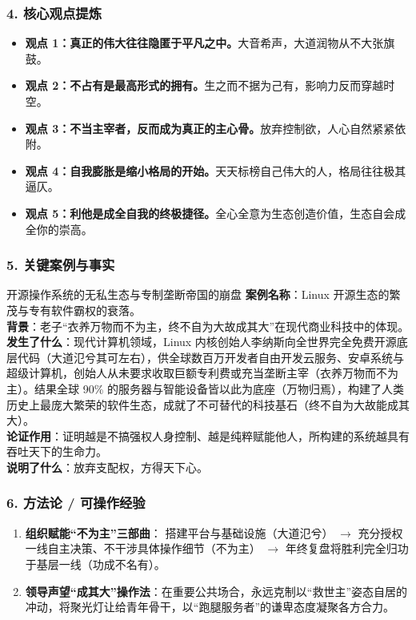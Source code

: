 \subsubsection{4. 核心观点提炼}
\begin{itemize}
    \item \textbf{观点 1：真正的伟大往往隐匿于平凡之中。}大音希声，大道润物从不大张旗鼓。
    \item \textbf{观点 2：不占有是最高形式的拥有。}生之而不据为己有，影响力反而穿越时空。
    \item \textbf{观点 3：不当主宰者，反而成为真正的主心骨。}放弃控制欲，人心自然紧紧依附。
    \item \textbf{观点 4：自我膨胀是缩小格局的开始。}天天标榜自己伟大的人，格局往往极其逼仄。
    \item \textbf{观点 5：利他是成全自我的终极捷径。}全心全意为生态创造价值，生态自会成全你的崇高。
\end{itemize}

\subsubsection{5. 关键案例与事实}
\begin{CaseBox}{开源操作系统的无私生态与专制垄断帝国的崩盘}
\textbf{案例名称}：Linux 开源生态的繁茂与专有软件霸权的衰落。\\
\textbf{背景}：老子“衣养万物而不为主，终不自为大故成其大”在现代商业科技中的体现。\\
\textbf{发生了什么}：现代计算机领域，Linux 内核创始人李纳斯向全世界完全免费开源底层代码（大道氾兮其可左右），供全球数百万开发者自由开发云服务、安卓系统与超级计算机，创始人从未要求收取巨额专利费或充当垄断主宰（衣养万物而不为主）。结果全球 90\% 的服务器与智能设备皆以此为底座（万物归焉），构建了人类历史上最庞大繁荣的软件生态，成就了不可替代的科技基石（终不自为大故能成其大）。\\
\textbf{论证作用}：证明越是不搞强权人身控制、越是纯粹赋能他人，所构建的系统越具有吞吐天下的生命力。\\
\textbf{说明了什么}：放弃支配权，方得天下心。
\end{CaseBox}

\subsubsection{6. 方法论 / 可操作经验}
\begin{enumerate}
    \item \textbf{组织赋能“不为主”三部曲}：
    搭建平台与基础设施（大道氾兮） $\rightarrow$ 充分授权一线自主决策、不干涉具体操作细节（不为主） $\rightarrow$ 年终复盘将胜利完全归功于基层一线（功成不名有）。
    \item \textbf{领导声望“成其大”操作法}：在重要公共场合，永远克制以“救世主”姿态自居的冲动，将聚光灯让给青年骨干，以“跑腿服务者”的谦卑态度凝聚各方合力。
\end{enumerate}

